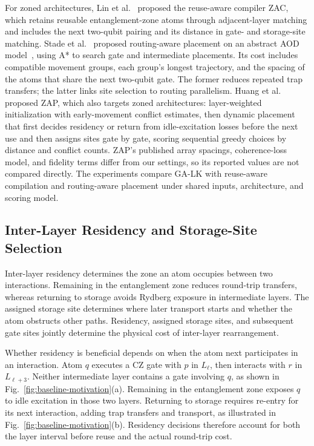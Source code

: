 For zoned architectures, Lin et al.~\cite{lin2025zac} proposed the reuse-aware compiler ZAC, which retains reusable entanglement-zone atoms through adjacent-layer matching and includes the next two-qubit pairing and its distance in gate- and storage-site matching. Stade et al.~\cite{stade2025routingaware} proposed routing-aware placement on an abstract AOD model~\cite{stade2024abstractmodel}, using A* to search gate and intermediate placements. Its cost includes compatible movement groups, each group's longest trajectory, and the spacing of the atoms that share the next two-qubit gate. The former reduces repeated trap transfers; the latter links site selection to routing parallelism. Huang et al.~\cite{huang2026zap} proposed ZAP, which also targets zoned architectures: layer-weighted initialization with early-movement conflict estimates, then dynamic placement that first decides residency or return from idle-excitation losses before the next use and then assigns sites gate by gate, scoring sequential greedy choices by distance and conflict counts. ZAP's published array spacings, coherence-loss model, and fidelity terms differ from our settings, so its reported values are not compared directly. The experiments compare GA-LK with reuse-aware compilation and routing-aware placement under shared inputs, architecture, and scoring model.

\subsection{Inter-Layer Residency and Storage-Site Selection}

Inter-layer residency determines the zone an atom occupies between two interactions. Remaining in the entanglement zone reduces round-trip transfers, whereas returning to storage avoids Rydberg exposure in intermediate layers. The assigned storage site determines where later transport starts and whether the atom obstructs other paths. Residency, assigned storage sites, and subsequent gate sites jointly determine the physical cost of inter-layer rearrangement.

Whether residency is beneficial depends on when the atom next participates in an interaction. Atom $q$ executes a CZ gate with $p$ in $L_\ell$, then interacts with $r$ in $L_{\ell+3}$. Neither intermediate layer contains a gate involving $q$, as shown in Fig.~\ref{fig:baseline-motivation}(a). Remaining in the entanglement zone exposes $q$ to idle excitation in those two layers. Returning to storage requires re-entry for its next interaction, adding trap transfers and transport, as illustrated in Fig.~\ref{fig:baseline-motivation}(b). Residency decisions therefore account for both the layer interval before reuse and the actual round-trip cost.

